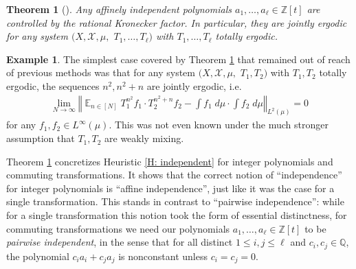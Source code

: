 \documentclass[11pt]{amsart}
\newtheorem{theorem}[lemma]{Theorem}
\theoremstyle{definition}
\newtheorem{example}[lemma]{Example}
\DeclareMathOperator*{\E}{\mathbb{E}}
\newcommand{\Q}{{\mathbb Q}}
\newcommand{\Z}{{\mathbb Z}}
\newcommand{\CX}{{\mathcal X}}
\newcommand{\norm}[1]{\left\Vert #1\right\Vert}
\newcommand{\1}{{\mathbf{1}}}
\begin{document}
\begin{theorem}%
[{\cite[Theorem 2.9]{FrKu22a}}]\label{T: FrKu affine independent}
    Any affinely independent polynomials $a_1, \ldots, a_\ell\in\Z[t]$ are controlled by the rational Kronecker factor. In particular, they are jointly ergodic for any system $(X, \CX, \mu,$\! $T_1, \ldots, T_\ell)$ with $T_1, \ldots, T_\ell$ totally ergodic.
\end{theorem}
\begin{example}
    The simplest case covered by Theorem \ref{T: FrKu affine independent} that remained out of reach of previous methods was that for any system $(X, \CX, \mu,$\! $T_1, T_2)$ with $T_1, T_2$ totally ergodic, the sequences $n^2, n^2+n$ are jointly ergodic, i.e.
    \begin{align*}
        \lim_{N\to\infty}\norm{\E_{n\in[N]}T_1^{n^2}f_1\cdot T_2^{n^2+n}f_2 - \int f_1\; d\mu\cdot \int f_2\; d\mu}_{L^2(\mu)} = 0
    \end{align*}
    for any $f_1, f_2\in L^\infty(\mu)$. This was not even known under the much stronger assumption that $T_1, T_2$ are weakly mixing. 
\end{example}
Theorem \ref{T: FrKu affine independent} concretizes Heuristic \ref{H: independent} for integer polynomials and commuting transformations. It shows that the correct notion of ``independence'' for integer polynomials is ``affine independence'', just like it was the case for a single transformation.  This stands in contrast to ``pairwise independence'': while for a single transformation this notion took the form of essential distinctness, for commuting transformations we need our polynomials $a_1, \ldots, a_\ell\in\Z[t]$ to be \emph{pairwise independent}, in the sense that for all distinct $1\leq i, j\leq \ell$ and $c_i,c_j\in\Q$, the polynomial $c_i a_i + c_j a_j$ is nonconstant unless $c_i = c_j = 0$.
\end{document}
